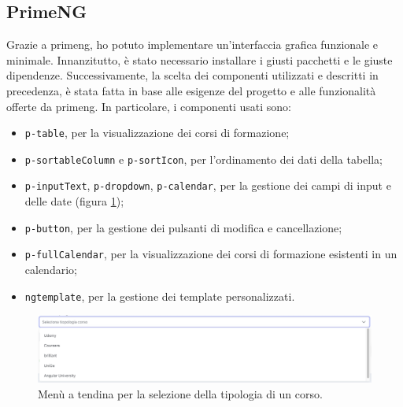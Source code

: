 \subsection{PrimeNG}\label{subsec:primeng}
Grazie a \acrshort{primeng}, ho potuto implementare un'interfaccia grafica funzionale e minimale.
Innanzitutto, è stato necessario installare i giusti pacchetti e le giuste dipendenze. Successivamente, la scelta dei componenti utilizzati e descritti in precedenza, è stata fatta in base alle esigenze del progetto e alle funzionalità offerte da \acrshort{primeng}.
In particolare, i componenti usati sono:
\begin{itemize}
  \item \texttt{p-table}, per la visualizzazione dei corsi di formazione;
  \item \texttt{p-sortableColumn} e \texttt{p-sortIcon}, per l'ordinamento dei dati della tabella;
  \item \texttt{p-inputText}, \texttt{p-dropdown}, \texttt{p-calendar}, per la gestione dei campi di input e delle date (figura \ref{fig:dropdown});
  \item \texttt{p-button}, per la gestione dei pulsanti di modifica e cancellazione;
  \item \texttt{p-fullCalendar}, per la visualizzazione dei corsi di formazione esistenti in un calendario;
  \item \texttt{ngtemplate}, per la gestione dei template personalizzati.
\end{itemize}
\begin{figure}[H]
\centering
\includegraphics[width=1\textwidth]{Images/dropdown.jpg}
\caption{\label{fig:dropdown}Menù a tendina per la selezione della tipologia di un corso.}
\end{figure}


